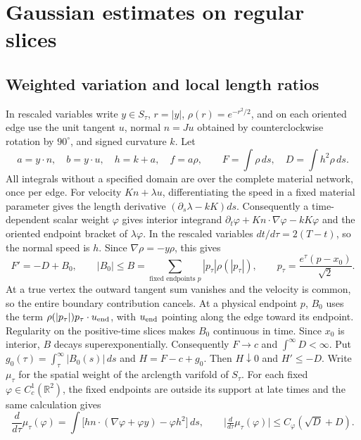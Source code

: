 \section{Gaussian estimates on regular slices}\label{sec:gaussian}

\subsection{Weighted variation and local length ratios}

In rescaled variables write \(y\in S_\tau\), \(r=|y|\), \(\rho(r)=e^{-r^2/2}\), and on each oriented edge use the unit tangent \(u\), normal \(n=Ju\) obtained by counterclockwise rotation by \(90^\circ\), and signed curvature \(k\). Let \[
 a=y\cdot n,\quad b=y\cdot u,\quad h=k+a,\quad f=a\rho,\qquad
 F=\int\rho\,ds,\quad D=\int h^2\rho\,ds .
\] All integrals without a specified domain are over the complete material network, once per edge. For velocity \(K n+\lambda u\), differentiating the speed in a fixed material parameter gives the length derivative \((\partial_s\lambda-kK)ds\). Consequently a time-dependent scalar weight \(\varphi\) gives interior integrand \(\partial_t\varphi+K n\cdot\nabla\varphi-kK\varphi\) and the oriented endpoint bracket of \(\lambda\varphi\). In the rescaled variables \(dt/d\tau=2(T-t)\), so the normal speed is \(h\). Since \(\nabla\rho=-y\rho\), this gives \[
 F'=-D+B_0,\qquad
 |B_0|\le B=\sum_{\text{fixed endpoints }p}|p_\tau|\rho(|p_\tau|),\qquad
 p_\tau=\frac{e^\tau(p-x_0)}{\sqrt2}.
\] At a true vertex the outward tangent sum vanishes and the velocity is common, so the entire boundary contribution cancels. At a physical endpoint \(p\), \(B_0\) uses the term \(\rho(|p_\tau|)p_\tau\cdot u_{\rm end}\), with \(u_{\rm end}\) pointing along the edge toward its endpoint. Regularity on the positive-time slices makes \(B_0\) continuous in time. Since \(x_0\) is interior, \(B\) decays superexponentially. Consequently \(F\to c\) and \(\int^\infty D<\infty\). Put \(g_0(\tau)=\int_\tau^\infty|B_0(s)|\,ds\) and \(H=F-c+g_0\). Then \(H\downarrow0\) and \(H'\le-D\). Write \(\mu_\tau\) for the spatial weight of the arclength varifold of \(S_\tau\). For each fixed \(\varphi\in C_c^1(\mathbb R^2)\), the fixed endpoints are outside its support at late times and the same calculation gives \begin{equation}\label{eq:weight-tests}
 \frac{d}{d\tau}\mu_\tau(\varphi)
  =\int\big[h n\cdot(\nabla\varphi+\varphi y)-\varphi h^2\big]\,ds,
 \qquad
 \big|\tfrac{d}{d\tau}\mu_\tau(\varphi)\big|
 \le C_\varphi(\sqrt D+D).
\end{equation}

